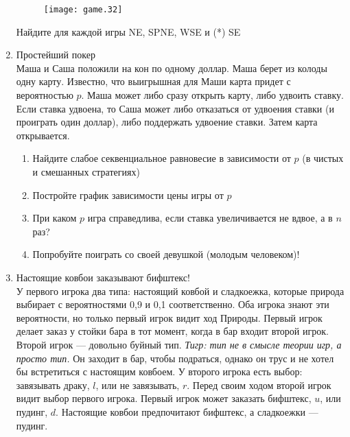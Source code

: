\documentclass[pdftex,12pt,a4paper]{article}
\begin{document}
\begin{enumerate}
\begin{figure}[!htbp]
    \texttt{[image: game.32]}
\end{figure} 

Найдите для каждой игры NE, SPNE, WSE и (*) SE 

\item Простейший покер \\
Маша и Саша положили на кон по одному доллар. Маша берет из колоды одну карту. Известно, что выигрышная для Маши карта придет с вероятностью $p$. Маша может либо сразу открыть карту, либо удвоить ставку. Если ставка удвоена, то Саша может либо отказаться от удвоения ставки (и проиграть один доллар), либо поддержать удвоение ставки. Затем карта открывается.
\begin{enumerate}
\item Найдите слабое секвенциальное равновесие в зависимости от $p$ (в чистых и смешанных стратегиях) 
\item Постройте график зависимости цены игры от $p$
\item При каком $p$ игра справедлива, если ставка увеличивается не вдвое, а в $n$  раз?
\item Попробуйте поиграть со своей девушкой (молодым человеком)!
\end{enumerate}

\item Настоящие ковбои заказывают бифштекс!\\
У первого игрока два типа: настоящий ковбой и сладкоежка, которые природа выбирает с вероятностями 0,9 и 0,1 соответственно. Оба игрока знают эти вероятности, но только первый игрок видит ход Природы. Первый игрок делает заказ у стойки бара в тот момент, когда в бар входит второй игрок.\\
Второй игрок --- довольно буйный тип. \textit{Тигр: тип не в смысле теории игр, а просто тип.} Он заходит в бар, чтобы подраться, однако он трус и не хотел бы встретиться с настоящим ковбоем. У второго игрока есть выбор: завязывать драку, $l$, или не завязывать, $r$. Перед своим ходом второй игрок видит выбор первого игрока. 
Первый игрок может заказать бифштекс, $u$, или пудинг, $d$. Настоящие ковбои предпочитают бифштекс, а сладкоежки --- пудинг.\\

\end{enumerate}
\end{document}
